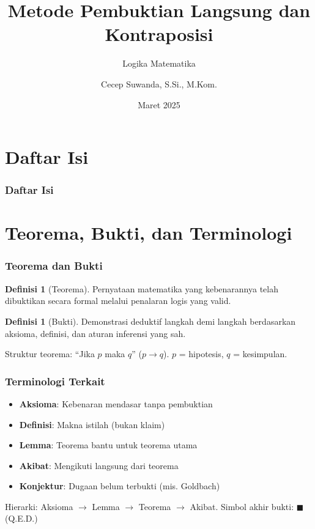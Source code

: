 \documentclass[handout]{beamer}
\subtitle[Logika Matematika]{Logika Matematika}
\title[Metode Pembuktian]{Metode Pembuktian Langsung dan Kontraposisi}
\author{Cecep Suwanda, S.Si., M.Kom.}
\date{Maret 2025}
\institute{Universitas Bale Bandung}
\theoremstyle{definition}
\newtheorem{definisi}[theorem]{Definisi}
\theoremstyle{example}
\begin{document}
\maketitle

\section*{Daftar Isi}
\begin{frame}
\frametitle{Daftar Isi}
\tableofcontents
\end{frame}

\section{Teorema, Bukti, dan Terminologi}

\begin{frame}
\frametitle{Teorema dan Bukti}
\begin{definisi}[Teorema]
Pernyataan matematika yang kebenarannya telah dibuktikan secara formal melalui penalaran logis yang valid.
\end{definisi}
\begin{definisi}[Bukti]
Demonstrasi deduktif langkah demi langkah berdasarkan aksioma, definisi, dan aturan inferensi yang sah.
\end{definisi}
Struktur teorema: ``Jika $p$ maka $q$'' ($p \to q$). $p$ = hipotesis, $q$ = kesimpulan.
\end{frame}

\begin{frame}
\frametitle{Terminologi Terkait}
\begin{itemize}
  \item \textbf{Aksioma}: Kebenaran mendasar tanpa pembuktian
  \item \textbf{Definisi}: Makna istilah (bukan klaim)
  \item \textbf{Lemma}: Teorema bantu untuk teorema utama
  \item \textbf{Akibat}: Mengikuti langsung dari teorema
  \item \textbf{Konjektur}: Dugaan belum terbukti (mis. Goldbach)
\end{itemize}
Hierarki: Aksioma $\to$ Lemma $\to$ Teorema $\to$ Akibat. Simbol akhir bukti: $\blacksquare$ (Q.E.D.)
\end{frame}

\end{document}
